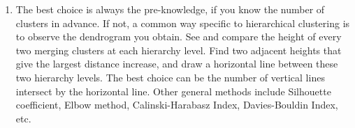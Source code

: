 \begin{enumerate}
\item The best choice is always the pre-knowledge, if you know the number of clusters in advance. If not, a common way specific to hierarchical clustering is to observe the dendrogram you obtain. See and compare the height of every two merging clusters at each hierarchy level. Find two adjacent heights that give the largest distance increase, and draw a horizontal line between these two hierarchy levels. The best choice can be the number of vertical lines intersect by the horizontal line. Other general methods include Silhouette coefficient, Elbow method, Calinski-Harabasz Index, Davies-Bouldin Index, etc.
\end{enumerate}




